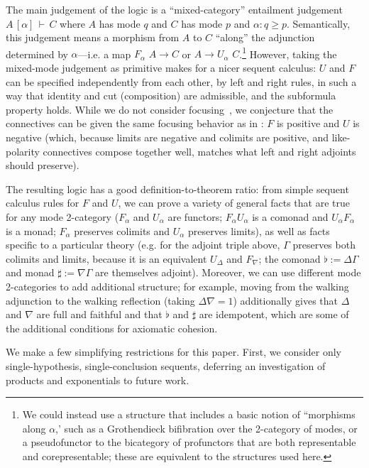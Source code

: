 \documentclass{drl-common/llncs}
\newcommand\F[2]{\ensuremath{F_{#1} \,\, #2}}
\newcommand\U[2]{\ensuremath{U_{#1} \,\, #2}}
\newcommand\seq[3]{\ensuremath{#1 \, [ #2 ] \, \vdash \, #3}}
\begin{document}
The main judgement of the logic is a ``mixed-category'' entailment
judgement \seq{A}{\alpha}{C} where $A$ has mode $q$ and $C$ has mode $p$
and $\alpha : q \ge p$.  Semantically, this judgement means a morphism
from $A$ to $C$ ``along'' the adjunction determined by $\alpha$---i.e. a
map $\F \alpha A \to C$ or $A \to \U \alpha C$.\footnote{We could instead
  use a structure that includes a basic notion of ``morphisms along
  $\alpha$,' such as a Grothendieck bifibration over the 2-category of
  modes, or a pseudofunctor to the bicategory of profunctors that are
  both representable and corepresentable; these are equivalent to the
  structures used here.}  However, taking the mixed-mode judgement as
primitive makes for a nicer sequent calculus: $U$ and $F$ can be
specified independently from each other, by left and right rules, in
such a way that identity and cut (composition) are admissible, and the
subformula property holds.  While we do not consider
focusing~\citep{andreoli92focus}, we conjecture that the connectives can
be given the same focusing behavior as in \citep{reed09adjoint}: $F$ is
positive and $U$ is negative (which, because limits are negative and
colimits are positive, and like-polarity connectives compose together
well, matches what left and right adjoints should preserve).

The resulting logic has a good definition-to-theorem ratio: from 
simple sequent calculus rules for $F$ and $U$, we can prove a variety of
general facts that are true for any mode 2-category ($F_\alpha$ and
$U_\alpha$ are functors; $F_\alpha U_\alpha$ is a comonad and $U_\alpha
F_\alpha$ is a monad; $F_\alpha$ preserves colimits and $U_\alpha$
preserves limits), as well as facts specific to a particular theory
(e.g. for the adjoint triple above, $\Gamma$ preserves both colimits
and limits, because it is an equivalent $U_\Delta$ and $F_\nabla$; the
comonad $\flat := \Delta\Gamma$ and monad $\sharp := \nabla\Gamma$ are
themselves adjoint).  Moreover, we can use different mode 2-categories
to add additional structure; for example, moving from the walking
adjunction to the walking reflection (taking $\Delta \nabla = 1$)
additionally gives that $\Delta$ and $\nabla$ are full and faithful and
that $\flat$ and $\sharp$ are idempotent, which are some of the
additional conditions for axiomatic cohesion.

We make a few simplifying restrictions for this paper. First, we
consider only single-hypothesis, single-conclusion sequents, deferring
an investigation of products and exponentials to future work.
\end{document}
